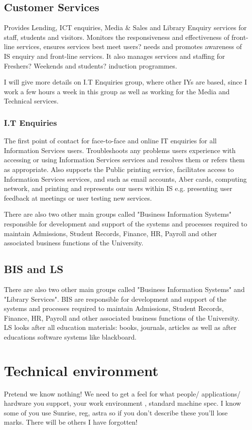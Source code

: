 \documentclass[10pt,a4paper,headinclude=true]{report}
\begin{document}
\section{Customer Services}
Provides Lending, ICT enquiries, Media \& Sales and Library Enquiry services for staff, students and visitors. Monitors the responsiveness and effectiveness of front-line services, ensures services best meet users? needs and promotes awareness of IS enquiry and front-line services. It also manages services and staffing for Freshers? Weekends and students? induction programmes.

I will give more details on I.T Enquiries group, where other IYs are based, since I work a few hours a week in this group as well as working for the Media and Technical services.

\subsection{I.T Enquiries}
The first point of contact for face-to-face and online IT enquiries for all Information Services users. Troubleshoots any problems users experience with accessing or using Information Services services and resolves them or refers them as appropriate. Also supports the Public printing service, facilitates access to Information Services services, and such as email accounts, Aber cards, computing network, and printing and represents our users within IS e.g. presenting user feedback at meetings or user testing new services.

There are also two other main groups called "Business Information Systems" responsible for development and support of the systems and processes required to maintain Admissions, Student Records, Finance, HR, Payroll and other associated business functions of the University.

\section{BIS and LS}
There are also two other main groups called "Business Information Systems" and "Library Services". BIS are  responsible for development and support of the systems and processes required to maintain Admissions, Student Records, Finance, HR, Payroll and other associated business functions of the University. LS looks after all education materials: books, journals, articles as well as after educations software systems like blackboard.

\chapter{Technical environment}
Pretend we know nothing! We need to get a feel for what people/ applications/
hardware you support, your work environment , standard machine spec. I know some of
you use Sunrise, reg, astra so if you don't describe these you'll lose marks. There
will be others I have forgotten!
\end{document}
